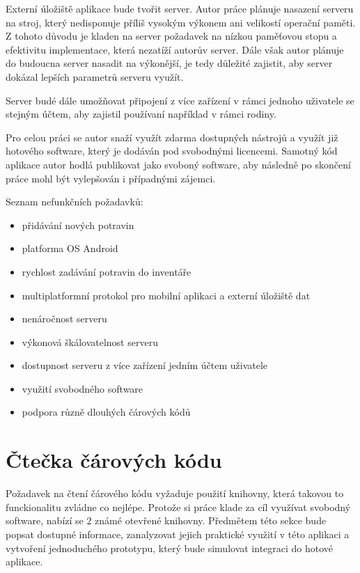 \documentclass[thesis=B,czech]{FITthesis}[2013/10/20]
\begin{document}
Externí úložiště aplikace bude tvořit server. Autor práce plánuje nasazení serveru na stroj, který nedisponuje příliš vysokým výkonem ani velikostí operační paměti. Z tohoto důvodu je kladen na server požadavek na nízkou paměťovou stopu a efektivitu implementace, která nezatíží autorův server. Dále však autor plánuje do budoucna server nasadit na výkonější, je tedy důležité zajistit, aby server dokázal lepších parametrů serveru využít.

Server budé dále umožňovat připojení z více zařízení v rámci jednoho uživatele se stejným účtem, aby zajistil používaní například v rámci rodiny. 

Pro celou práci se autor snaží využít zdarma dostupných nástrojů a využít již hotového software, který je dodáván pod svobodnými licencemi. Samotný kód aplikace autor hodlá publikovat jako svoboný software, aby následně po skončení práce mohl být vylepšován i případnými zájemci.

Seznam nefunkčních požadavků:

\begin{itemize}
  \item přidávání nových potravin
  \item platforma OS Android
  \item rychlost zadávání potravin do inventáře
  \item multiplatformní protokol pro mobilní aplikaci a externí úložiště dat
  \item nenáročnost serveru
  \item výkonová škálovatelnost serveru
  \item dostupnost serveru z více zařízení jedním účtem uživatele
  \item využití svobodného software
  \item podpora různě dlouhých čárových kódů
\end{itemize}

\clearpage

\section{Čtečka čárových kódu}

Požadavek na čtení čárového kódu vyžaduje použití knihovny, která takovou to funckionalitu zvládne co nejlépe. Protože si práce klade za cíl využívat svobodný software, nabízí se 2 známé otevřené knihovny. Předmětem této sekce bude popsat dostupné informace, zanalyzovat jejich praktické využití v této aplikaci a vytvoření jednoduchého prototypu, který bude simulovat integraci do hotové aplikace.
\end{document}
